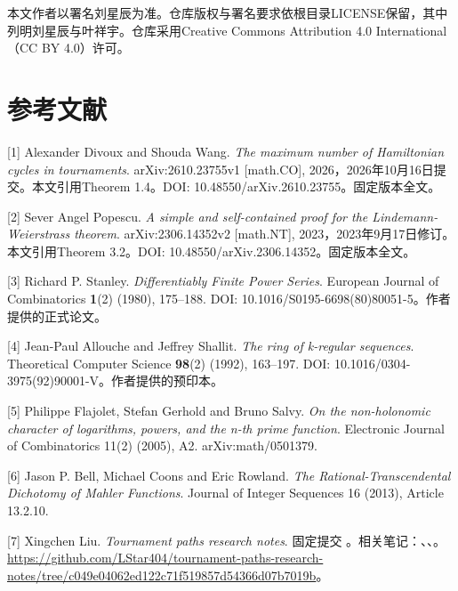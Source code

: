 \documentclass[UTF8,11pt,fontset=fandol]{ctexart}
\begin{document}
本文作者以署名刘星辰为准。仓库版权与署名要求依根目录LICENSE保留，其中列明刘星辰与叶祥宇。仓库采用Creative Commons Attribution 4.0 International（CC BY 4.0）许可。

\clearpage
\section*{参考文献}
[1] Alexander Divoux and Shouda Wang. \emph{The maximum number of Hamiltonian cycles in tournaments}. arXiv:2610.23755v1 [math.CO], 2026，2026年10月16日提交。本文引用Theorem 1.4。DOI: 10.48550/arXiv.2610.23755。固定版本全文。

[2] Sever Angel Popescu. \emph{A simple and self-contained proof for the Lindemann-Weierstrass theorem}. arXiv:2306.14352v2 [math.NT], 2023，2023年9月17日修订。本文引用Theorem 3.2。DOI: 10.48550/arXiv.2306.14352。固定版本全文。

[3] Richard P. Stanley. \emph{Differentiably Finite Power Series}. European Journal of Combinatorics \textbf{1}(2) (1980), 175–188. DOI: 10.1016/S0195-6698(80)80051-5。作者提供的正式论文。

[4] Jean-Paul Allouche and Jeffrey Shallit. \emph{The ring of k-regular sequences}. Theoretical Computer Science \textbf{98}(2) (1992), 163–197. DOI: 10.1016/0304-3975(92)90001-V。作者提供的预印本。

[5] Philippe Flajolet, Stefan Gerhold and Bruno Salvy. \emph{On the non-holonomic character of logarithms, powers, and the n-th prime function}. Electronic Journal of Combinatorics 11(2) (2005), A2. arXiv:math/0501379.

[6] Jason P. Bell, Michael Coons and Eric Rowland. \emph{The Rational-Transcendental Dichotomy of Mahler Functions}. Journal of Integer Sequences 16 (2013), Article 13.2.10.

[7] Xingchen Liu. \emph{Tournament paths research notes}. 固定提交 。相关笔记：、、。\url{https://github.com/LStar404/tournament-paths-research-notes/tree/c049e04062ed122c71f519857d54366d07b7019b}。
\end{document}
